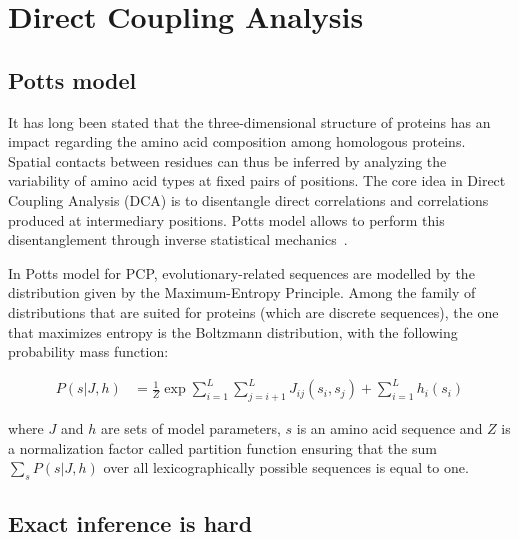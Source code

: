 \section{Direct Coupling Analysis}

    \subsection{Potts model} \label{potts}

        It has long been stated that the three-dimensional structure of proteins
        has an impact regarding the amino acid composition among
        homologous proteins. Spatial contacts between residues can thus be inferred  %
        by analyzing the variability of amino acid types at fixed pairs of positions.
        The core idea in Direct Coupling Analysis (DCA) is to disentangle direct
        correlations and correlations produced at intermediary positions.
        Potts model allows to perform this disentanglement through inverse
        statistical mechanics~\cite{PhysRevE.87.012707}.

        In Potts model for PCP, evolutionary-related sequences are modelled by the distribution
        given by the Maximum-Entropy Principle. Among the family of distributions that are suited
        for proteins (which are discrete sequences), the one that maximizes entropy is the
        Boltzmann distribution, with the following probability mass function:

        \begin{equation}
            \begin{split}  %
                P(s \vert J, h) & = \frac{1}{Z} \exp{\sum\limits_{i=1}^L \sum\limits_{j=i+1}^L J_{ij}(s_i, s_j) + \sum\limits_{i=1}^L h_i(s_i)}
            \end{split}
        \end{equation}

        where $J$ and $h$ are sets of model parameters, $s$ is an amino acid sequence and
        $Z$ is a normalization factor called partition function ensuring
        that the sum $\sum_s P(s \vert J, h)$ over all lexicographically
        possible sequences is equal to one.

    \subsection{Exact inference is hard}


